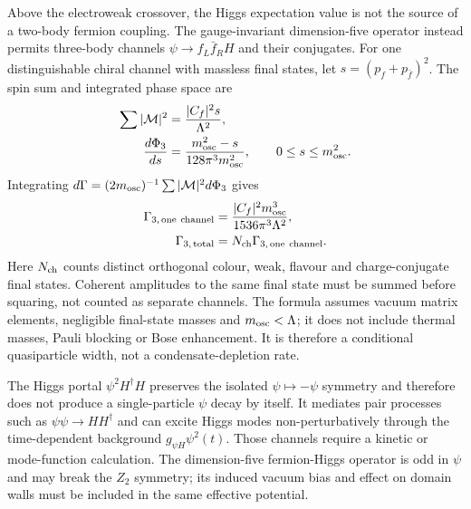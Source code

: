 \documentclass[epj]{svjour}
\begin{document}
Above the electroweak crossover, the Higgs expectation value is
not the source of a two-body fermion coupling. The gauge-invariant
dimension-five operator instead permits three-body channels
$\psi\to f_L\bar f_R H$ and their conjugates. For one
distinguishable chiral channel with massless final states, let
$s=(p_f+p_{\bar f})^2$. The spin sum and integrated phase space are
\begin{equation}
\begin{aligned}
\sum|\mathcal M|^2
&=\frac{|C_f|^2s}{\Lambda^2},\\
\frac{d\Phi_3}{ds}
&=\frac{m_{\rm osc}^2-s}{128\pi^3m_{\rm osc}^2},
\qquad 0\leq s\leq m_{\rm osc}^2.
\end{aligned}
\end{equation}
Integrating $d\Gamma=(2m_{\rm osc})^{-1}
\sum|\mathcal M|^2d\Phi_3$ gives
\begin{equation}
\begin{aligned}
\Gamma_{3,\,\mathrm{one\ channel}}
&=\frac{|C_f|^2m_{\rm osc}^3}
{1536\pi^3\Lambda^2},\\
\Gamma_{3,\,\mathrm{total}}
&=N_{\rm ch}\Gamma_{3,\,\mathrm{one\ channel}}.
\end{aligned}
\label{eq:ptum_unbroken_phase_three_body_width}
\end{equation}
Here $N_{\rm ch}$ counts distinct orthogonal colour, weak,
flavour and charge-conjugate final states. Coherent amplitudes to
the same final state must be summed before squaring, not counted
as separate channels. The formula assumes vacuum matrix elements,
negligible final-state masses and $m_{\rm osc}<\Lambda$; it
does not include thermal masses, Pauli blocking or Bose enhancement.
It is therefore a conditional quasiparticle width, not a
condensate-depletion rate.

The Higgs portal $\psi^2H^\dagger H$ preserves the isolated
$\psi\mapsto-\psi$ symmetry and therefore does not produce a
single-particle $\psi$ decay by itself. It mediates pair processes
such as $\psi\psi\to HH^\dagger$ and can excite Higgs modes
non-perturbatively through the time-dependent background
$g_{\psi H}\psi^2(t)$. Those channels require a kinetic or
mode-function calculation. The dimension-five fermion-Higgs
operator is odd in $\psi$ and may break the $Z_2$ symmetry; its
induced vacuum bias and effect on domain walls must be included
in the same effective potential.
\end{document}
